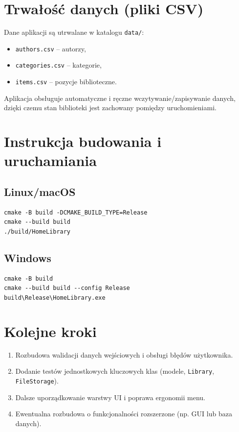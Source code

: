 \documentclass[12pt,a4paper]{article}
\begin{document}
\section{Trwałość danych (pliki CSV)}
Dane aplikacji są utrwalane w katalogu \texttt{data/}:
\begin{itemize}[leftmargin=*]
    \item \texttt{authors.csv} -- autorzy,
    \item \texttt{categories.csv} -- kategorie,
    \item \texttt{items.csv} -- pozycje biblioteczne.
\end{itemize}
Aplikacja obsługuje automatyczne i ręczne wczytywanie/zapisywanie danych,
dzięki czemu stan biblioteki jest zachowany pomiędzy uruchomieniami.

\section{Instrukcja budowania i uruchamiania}
\subsection*{Linux/macOS}
\begin{verbatim}
cmake -B build -DCMAKE_BUILD_TYPE=Release
cmake --build build
./build/HomeLibrary
\end{verbatim}

\subsection*{Windows}
\begin{verbatim}
cmake -B build
cmake --build build --config Release
build\Release\HomeLibrary.exe
\end{verbatim}

\section{Kolejne kroki}
\begin{enumerate}[leftmargin=*]
    \item Rozbudowa walidacji danych wejściowych i obsługi błędów użytkownika.
    \item Dodanie testów jednostkowych kluczowych klas (modele, \texttt{Library}, \texttt{FileStorage}).
    \item Dalsze uporządkowanie warstwy UI i poprawa ergonomii menu.
    \item Ewentualna rozbudowa o funkcjonalności rozszerzone (np. GUI lub baza danych).
\end{enumerate}
\end{document}

